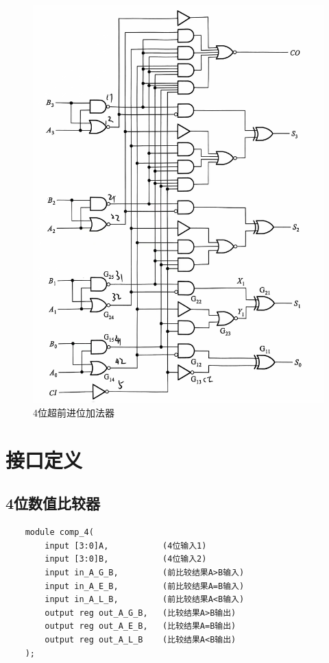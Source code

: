 \documentclass[fontset=windows,12pt]{article}
\begin{document}
\begin{figure}[ht]
\begin{minipage}[t]{0.5\linewidth}
            \includegraphics[width=1\textwidth]{4位超前进位加法器`.jpg}
            \caption{4位超前进位加法器}
        \end{minipage}
    \end {figure}


\section{接口定义}
    \subsection{4位数值比较器}
    {\setmainfont{Courier New Bold} 
    \begin{lstlisting}
    module comp_4(
        input [3:0]A,           (4位输入1)
        input [3:0]B,           (4位输入2)
        input in_A_G_B,         (前比较结果A>B输入)
        input in_A_E_B,         (前比较结果A=B输入)
        input in_A_L_B,         (前比较结果A<B输入)
        output reg out_A_G_B,   (比较结果A>B输出)
        output reg out_A_E_B,   (比较结果A=B输出)
        output reg out_A_L_B    (比较结果A<B输出)
    );
    \end{lstlisting}}
\end{document}
